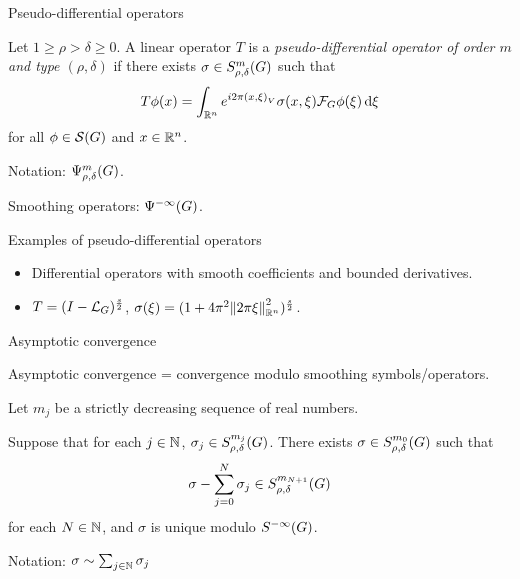 \documentclass[handout]{beamer}
\begin{document}
\begin{frame}
    {Pseudo-differential operators}

    \begin{definition}

        Let $1 \geq \rho > \delta \geq 0$.
        A linear operator $T$ is a \emph{pseudo-differential operator of order $m$ and type $(\rho, \delta)$}
        if there exists $\sigma \in \SymbolClass m {\rho, \delta}$ such that
        \begin{align*}
            T \phi(x)
            = \int_{\R^n} \e^{\i \turn \ip x \xi} \sigma(x, \xi) \Fourier \phi(\xi) \dd \xi
        \end{align*}
        for all $\phi \in \Schwartz \Group$ and $x \in \R^n$.

        \pause
        Notation: $\OperatorClass m {\rho, \delta}$.
    \end{definition}
    \pause
    Smoothing operators: $\SmoothingOperators$.
\end{frame}

\begin{frame}
    {Examples of pseudo-differential operators}

    \begin{itemize}
        \item Differential operators with smooth coefficients and bounded derivatives.
        \item $T = \BesselPotential s$, $\sigma(\xi) = (1 + 4 \pi^2 \norm [\R^n] {\turn \xi}^2)^{\frac s 2}$.
    \end{itemize}
\end{frame}

\begin{frame}
    {Asymptotic convergence}

    Asymptotic convergence = convergence modulo smoothing symbols/operators.
    \pause
    \begin{theorem}
        Let $m_j$ be a strictly decreasing sequence of real numbers.

        Suppose that for each $j \in \N$, $\sigma_j \in \SymbolClass {m_j} {\rho, \delta}$.
        There exists $\sigma \in \SymbolClass {m_0} {\rho, \delta}$ such that \begin{align*}
            \sigma - \sum_{j = 0}^{N} \sigma_j \in \SymbolClass {m_{N + 1}} {\rho, \delta}
        \end{align*}
        for each $N \in \N$,
        and $\sigma$ is unique modulo $\SmoothingSymbols$.
    \end{theorem}

    \pause
    Notation: $\sigma \sim \sum_{j \in \N} \sigma_j$
\end{frame}
\end{document}
